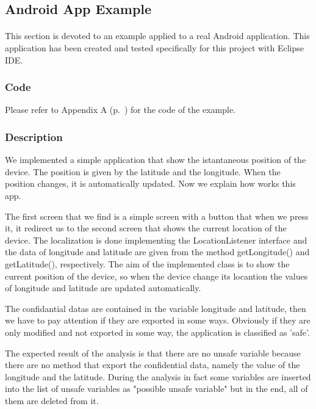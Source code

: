 \documentclass[letterpaper,twocolumn,10pt]{article}
\begin{document}
\subsection{Android App Example}
\paragraph{}
This section is devoted to an example applied to a real Android application. This application has been created and tested specifically for this project with Eclipse IDE.

\subsubsection{Code}
Please refer to Appendix A (p.~\pageref{app:appendixA}) for the code of the example.

\subsubsection{Description}
We implemented a simple application that show the istantaneous position of the device. The position is given by the latitude and the longitude. When the position changes, it is automatically updated. Now we explain how works this app.

The first screen that we find is a simple screen with a button that when we press it, it redirect us to the second screen that shows the current location of the device. The localization is done implementing the LocationListener interface and the data of longitude and latitude are given from the method getLongitude() and getLatitude(), respectively. The aim of the implemented class is to show the current position of the device, so when the device change its locantion the values of longitude and latitude are updated automatically. 

The confidantial datas are contained in the variable longitude and latitude, then we have to pay attention if they are exported in some ways. Obviously if they are only modified and not exported in some way, the application is classified as 'safe'.

The expected result of the analysis is that there are no unsafe variable because there are no method that export the confidential data, namely the value of the longitude and the latitude. During the analysis in fact some variables are inserted into the list of unsafe variables as "possible unsafe variable" but in the end, all of them are deleted from it. 
\end{document}
